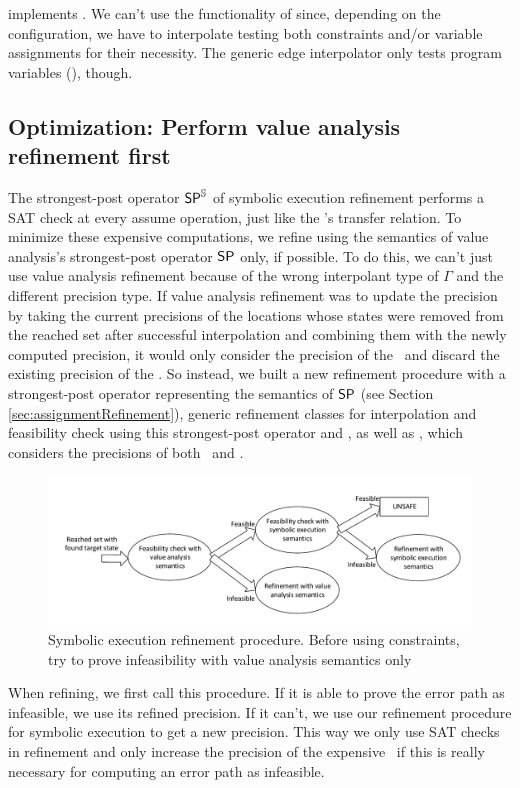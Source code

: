  implements .
We can't use the functionality of  since, depending on the configuration, we have to interpolate
testing both constraints and/or variable assignments for their necessity.
The generic edge interpolator only tests program variables (), though.

\subsection{Optimization: Perform value analysis refinement first}
The strongest-post operator $\operatorname{\operatorname{\operatorname{\mathsf{SP}}}^{\mathbb{S}}}$ of symbolic execution refinement performs a SAT check at every assume operation, just like the \symbolicExecutionCPA's transfer relation.
To minimize these expensive computations, we refine using the semantics of value analysis's strongest-post operator $\operatorname{\operatorname{\operatorname{\mathsf{SP}}}}$ only, if possible.
To do this, we can't just use value analysis refinement because of the wrong interpolant type of $\Gamma$ and the different precision type.
If value analysis refinement was to update the precision by taking the current precisions of the locations whose states were removed from the reached set after successful interpolation and combining them with the newly computed precision, it would only consider the precision of the \ and discard the existing precision of the \constraintsCPA.
So instead, we built a new refinement procedure with a strongest-post operator representing the semantics of $\operatorname{\operatorname{\operatorname{\mathsf{SP}}}}$ (see Section \ref{sec:assignmentRefinement}),  generic refinement classes for interpolation and feasibility check using this strongest-post operator and , as well as , which considers the precisions of both \ and \constraintsCPA.

\begin{figure}[t!]
\includegraphics[width=\linewidth]{implementationCegar/DelegatingRefinementFlow}
\caption{Symbolic execution refinement procedure. Before using constraints, try to prove infeasibility with value analysis semantics only}
\label{fig:delegatingRefFlow}
\end{figure}
When refining, we first call this procedure. If it is able to prove the error path as infeasible, we use its refined precision.
If it can't, we use our refinement procedure for symbolic execution to get a new precision.
This way we only use SAT checks in refinement and only increase the precision of the expensive \constraintsCPA\ if this is really necessary for computing an error path as infeasible.

